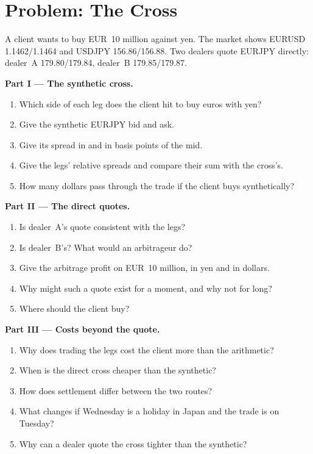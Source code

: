 \section{Problem: The Cross}

\begin{problem}\label{pb:m2:the-fx-market:1}
A client wants to buy EUR~10 million against yen. The market shows EURUSD
1.1462/1.1464 and USDJPY 156.86/156.88. Two dealers quote EURJPY directly:
dealer~A 179.80/179.84, dealer~B 179.85/179.87.

\medskip\noindent\textbf{Part I --- The synthetic cross.}
\begin{enumerate}
\item Which side of each leg does the client hit to buy euros with yen?
\item Give the synthetic EURJPY bid and ask.
\item Give its spread in  and in basis points of the mid.
\item Give the legs' relative spreads and compare their sum with the cross's.
\item How many dollars pass through the trade if the client buys synthetically?
\end{enumerate}

\medskip\noindent\textbf{Part II --- The direct quotes.}
\begin{enumerate}[resume]
\item Is dealer~A's quote consistent with the legs?
\item Is dealer~B's? What would an arbitrageur do?
\item Give the arbitrage profit on EUR~10 million, in yen and in dollars.
\item Why might such a quote exist for a moment, and why not for long?
\item Where should the client buy?
\end{enumerate}

\medskip\noindent\textbf{Part III --- Costs beyond the quote.}
\begin{enumerate}[resume]
\item Why does trading the legs cost the client more than the arithmetic?
\item When is the direct cross cheaper than the synthetic?
\item How does settlement differ between the two routes?
\item What changes if Wednesday is a holiday in Japan and the trade is on Tuesday?
\item Why can a dealer quote the cross tighter than the synthetic?
\end{enumerate}


\end{problem}
